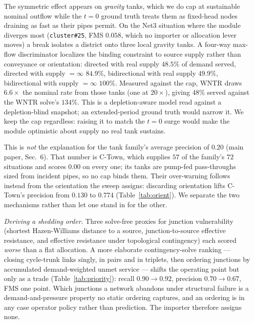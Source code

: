 \documentclass[11pt]{article}
\begin{document}
The symmetric effect appears on \emph{gravity} tanks, which we do cap at
sustainable nominal outflow while the $t=0$ ground truth treats them as
fixed-head nodes draining as fast as their pipes permit. On the Net3 situation
where the module diverges most (\texttt{cluster\#25}, FMS $0.058$, which no
importer or allocation lever moves) a break isolates a district onto three local
gravity tanks. A four-way max-flow discriminator localizes the binding constraint
to source supply rather than conveyance or orientation: directed with real supply
$48.5\%$ of demand served, directed with supply $=\infty$ $84.9\%$, bidirectional
with real supply $49.9\%$, bidirectional with supply $=\infty$ $100\%$. Measured
against the cap, WNTR draws $6.6\times$ the nominal rate from those tanks (one at
$20\times$), giving $48\%$ served against the WNTR solve's $134\%$. This is a
depletion-aware model read against a depletion-blind snapshot; an extended-period
ground truth would narrow it. We keep the cap regardless: raising it to match the
$t=0$ surge would make the module optimistic about supply no real tank sustains.

This is \emph{not} the explanation for the tank family's average precision of
$0.20$ (main paper, Sec.~6). That number is C-Town, which supplies $57$ of the
family's $72$ situations and scores $0.00$ on every one; its tanks are pump-fed
pass-throughs sized from incident pipes, so no cap binds them. Their over-warning
follows instead from the orientation the sweep assigns: discarding orientation lifts
C-Town's precision from $0.130$ to $0.774$ (Table~\ref{tab:orient}). We separate the
two mechanisms rather than let one stand in for the other.

\emph{Deriving a shedding order.} Three solve-free proxies for junction
vulnerability (shortest Hazen-Williams distance to a source, junction-to-source
effective resistance, and effective resistance under topological contingency)
each scored \emph{worse} than a flat allocation. A more elaborate
contingency-solve ranking --- closing cycle-trunk links singly, in pairs and in
triplets, then ordering junctions by accumulated demand-weighted unmet service
--- shifts the operating point but only as a trade (Table~\ref{tab:priority}):
recall $0.90 \to 0.92$, precision $0.70 \to 0.67$, FMS one point. Which junctions
a network abandons under structural failure is a demand-and-pressure property no
static ordering captures, and an ordering is in any case operator policy rather
than prediction. The importer therefore assigns none.
\end{document}
